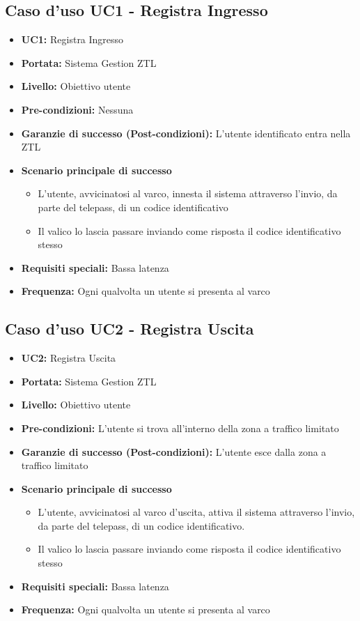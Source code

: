 \documentclass[12pt, letterpaper]{article}
\begin{document}
\subsection{Caso d'uso UC1 - Registra Ingresso}

\begin{itemize}
\item \textbf{UC1:} Registra Ingresso
\item \textbf{Portata:} Sistema Gestion ZTL
\item \textbf{Livello:} Obiettivo utente
\item \textbf{Pre-condizioni:} Nessuna
\item \textbf{Garanzie di successo (Post-condizioni):} L'utente identificato entra nella ZTL

\item \textbf{Scenario principale di successo}
\begin{itemize}
    \item L'utente, avvicinatosi al varco, innesta il sistema attraverso l'invio, da parte del telepass, di un codice identificativo
    \item Il valico lo lascia passare inviando come 
    risposta il codice identificativo stesso 
\end{itemize}

\item \textbf{Requisiti speciali:} Bassa latenza
\item \textbf{Frequenza:} Ogni qualvolta un utente si presenta al varco
\end{itemize}

\subsection{Caso d'uso UC2 - Registra Uscita}
\begin{itemize}
\item \textbf{UC2:} Registra Uscita
\item \textbf{Portata:} Sistema Gestion ZTL
\item \textbf{Livello:} Obiettivo utente
\item \textbf{Pre-condizioni:} L'utente si trova all'interno della zona a traffico limitato
\item \textbf{Garanzie di successo (Post-condizioni):} L'utente esce dalla zona a traffico limitato
\item \textbf{Scenario principale di successo}
\begin{itemize}
    \item L'utente, avvicinatosi al varco d'uscita, attiva il sistema attraverso l'invio, da parte del telepass, di un codice identificativo.
    \item Il valico lo lascia passare inviando come 
    risposta il codice identificativo stesso    
\end{itemize}   

\item \textbf{Requisiti speciali:} Bassa latenza
\item \textbf{Frequenza:} Ogni qualvolta un utente si presenta al varco
\end{itemize}
\end{document}
